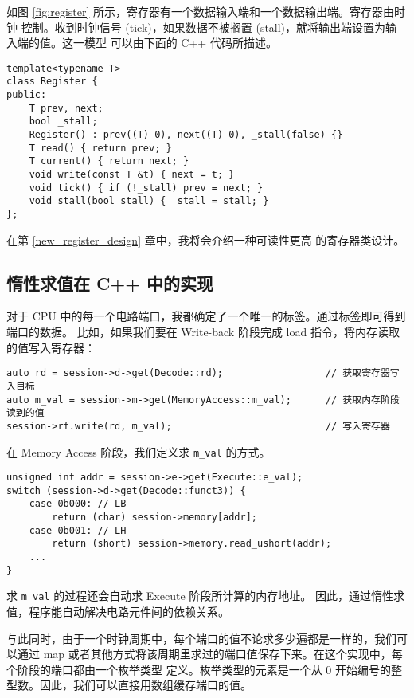 \documentclass[12pt]{article}
\begin{document}
    如图 \ref{fig:register} 所示，寄存器有一个数据输入端和一个数据输出端。寄存器由时钟
    控制。收到时钟信号 (tick)，如果数据不被搁置 (stall)，就将输出端设置为输入端的值。这一模型
    可以由下面的 C++ 代码所描述。

    \begin{verbatim}
template<typename T>
class Register {
public:
    T prev, next;
    bool _stall;
    Register() : prev((T) 0), next((T) 0), _stall(false) {}
    T read() { return prev; }
    T current() { return next; }
    void write(const T &t) { next = t; }
    void tick() { if (!_stall) prev = next; }
    void stall(bool stall) { _stall = stall; }
};
    \end{verbatim}
    \begin{tcolorbox}
        在第 \ref{new_register_design} 章中，我将会介绍一种可读性更高
        的寄存器类设计。
    \end{tcolorbox}

    \subsection{惰性求值在 C++ 中的实现}

    对于 CPU 中的每一个电路端口，我都确定了一个唯一的标签。通过标签即可得到端口的数据。
    比如，如果我们要在 Write-back 阶段完成 load 指令，将内存读取的值写入寄存器：
    \begin{verbatim}
auto rd = session->d->get(Decode::rd);                  // 获取寄存器写入目标
auto m_val = session->m->get(MemoryAccess::m_val);      // 获取内存阶段读到的值
session->rf.write(rd, m_val);                           // 写入寄存器
    \end{verbatim}

    在 Memory Access 阶段，我们定义求 \texttt{m\_val} 的方式。

    \begin{verbatim}
unsigned int addr = session->e->get(Execute::e_val);
switch (session->d->get(Decode::funct3)) {
    case 0b000: // LB
        return (char) session->memory[addr];
    case 0b001: // LH
        return (short) session->memory.read_ushort(addr);
    ...
}
    \end{verbatim}

    求 \texttt{m\_val} 的过程还会自动求 Execute 阶段所计算的内存地址。
    因此，通过惰性求值，程序能自动解决电路元件间的依赖关系。

    与此同时，由于一个时钟周期中，每个端口的值不论求多少遍都是一样的，我们可以通过 map
    或者其他方式将该周期里求过的端口值保存下来。在这个实现中，每个阶段的端口都由一个枚举类型
    定义。枚举类型的元素是一个从 0 开始编号的整型数。因此，我们可以直接用数组缓存端口的值。
    
\end{document}
